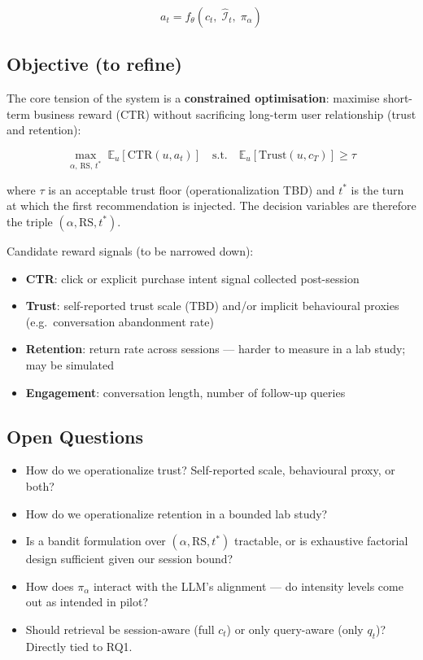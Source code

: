 \documentclass{article}
\begin{document}
\begin{equation}
    a_t = f_\theta\!\left(c_t,\; \hat{\mathcal{I}}_t,\; \pi_\alpha\right)
\end{equation}
 
\subsection{Objective (to refine)}
 
The core tension of the system is a \textbf{constrained optimisation}: maximise short-term business reward (CTR) without sacrificing long-term user relationship (trust and retention):
 
\begin{equation}
    \max_{\alpha,\, \text{RS},\, t^*}\; \mathbb{E}_{u}\!\left[\text{CTR}(u, a_t)\right]
    \quad \text{s.t.} \quad
    \mathbb{E}_{u}\!\left[\text{Trust}(u, c_T)\right] \geq \tau
\end{equation}
 
where $\tau$ is an acceptable trust floor (operationalization TBD) and $t^*$ is the turn at which the first recommendation is injected. The decision variables are therefore the triple $(\alpha, \text{RS}, t^*)$.
 
\medskip\noindent
Candidate reward signals (to be narrowed down):
\begin{itemize}
    \item \textbf{CTR}: click or explicit purchase intent signal collected post-session
    \item \textbf{Trust}: self-reported trust scale (TBD) and/or implicit behavioural proxies (e.g.\ conversation abandonment rate)
    \item \textbf{Retention}: return rate across sessions — harder to measure in a lab study; may be simulated
    \item \textbf{Engagement}: conversation length, number of follow-up queries
\end{itemize}
 
\subsection{Open Questions}
 
\begin{itemize}
    \item How do we operationalize trust? Self-reported scale, behavioural proxy, or both?
    \item How do we operationalize retention in a bounded lab study?
    \item Is a bandit formulation over $(\alpha, \text{RS}, t^*)$ tractable, or is exhaustive factorial design sufficient given our session bound?
    \item How does $\pi_\alpha$ interact with the LLM's alignment — do intensity levels come out as intended in pilot?
    \item Should retrieval be session-aware (full $c_t$) or only query-aware (only $q_t$)? Directly tied to RQ1.
\end{itemize}
\newpage 
\end{document}
